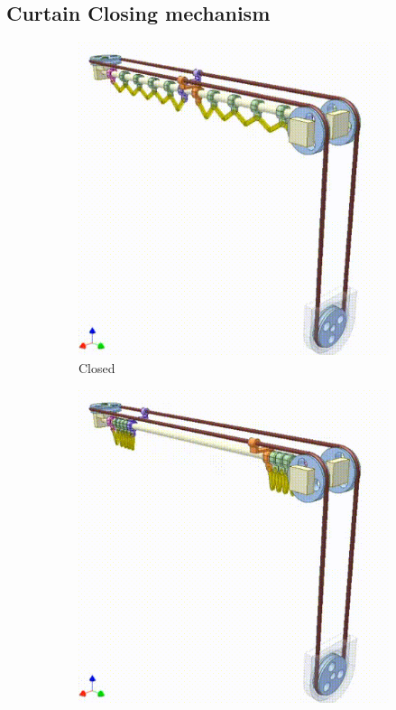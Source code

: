 \documentclass[a4paper,12pt]{article}
\begin{document}
\subsection{Curtain Closing mechanism}

\begin{figure}
    \centering
    \begin{subfigure}{0.3\textwidth}
        \includegraphics[width=\textwidth]{figures/initialCurtainMechanism1.png}
        \caption{Closed}
    \end{subfigure}
    \hfill
    \begin{subfigure}{0.3\textwidth}
        \includegraphics[width=\textwidth]{figures/initialCurtainMechanism2.png}

\end{subfigure}
\end{figure}
\end{document}
